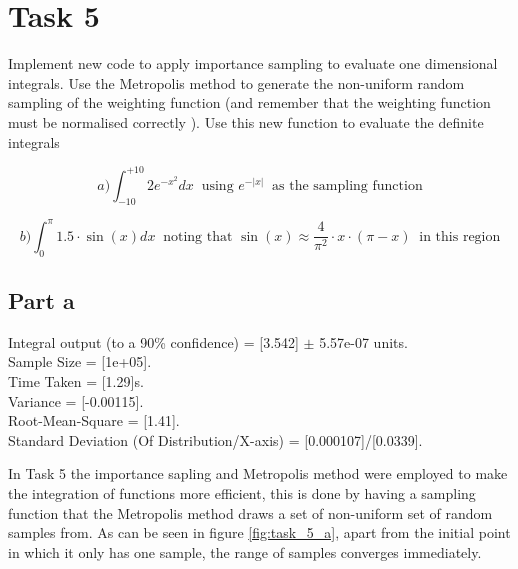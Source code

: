 \documentclass[12pt, A4]{article}
\begin{document}

\section{Task 5} %
\label{sec:Task 5}


Implement new code to apply importance sampling to evaluate one
dimensional integrals. Use the Metropolis method to generate the
non-uniform random sampling of the weighting function (and
remember that the weighting function must be normalised correctly ).
Use this new function to evaluate the definite integrals

$$a) \int^{+10}_{-10}2e^{-x^2}dx \;\; \textrm{using } e^{-|x|} \;\; \textrm{as the sampling function}$$

$$b) \int^{\pi}_{0}1.5\cdot \sin(x) dx \;\; \textrm{noting that } \sin(x)\approx \frac{4}{\pi^2}\cdot x \cdot (\pi - x) \;\; \textrm{in this region}$$


\subsection{Part a} %
\label{sub:task5Parta}

Integral output (to a 90\% confidence) = [3.542] $\pm$  5.57e-07 units.
\\
Sample Size = [1e+05].
\\
Time Taken = [1.29]s.
\\
Variance = [-0.00115].
\\
Root-Mean-Square = [1.41].
\\
Standard Deviation (Of Distribution/X-axis) = [0.000107]/[0.0339]. 

\vspace{1em}

In Task 5 the importance sapling and Metropolis method were employed to make the 
integration of functions more efficient, this is done by having a sampling function that the Metropolis
method draws a set of non-uniform set of random samples from. As can be seen in figure \ref{fig:task_5_a},
apart from the initial point in which it only has one sample, the range of samples converges immediately.
\end{document}

